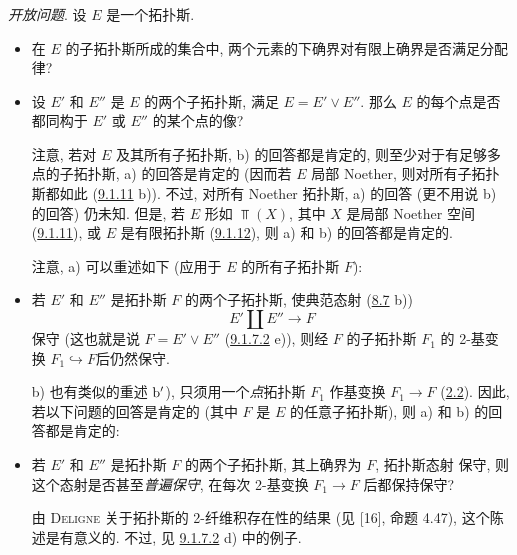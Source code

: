 \setcounter{subsubsection}{13}
\subsubsection{}
\emph{开放问题}.
设 $E$ 是一个拓扑斯.

\begin{itemize}
\item[a)] 在 $E$ 的子拓扑斯所成的集合中,
两个元素的下确界对有限上确界是否满足分配律?

\item[b)] 设 $E'$ 和 $E''$ 是 $E$ 的两个子拓扑斯,
满足 $E=E'\vee E''$.
那么 $E$ 的每个点是否都同构于 $E'$ 或 $E''$ 的某个点的像?

注意, 若对 $E$ 及其所有子拓扑斯, b) 的回答都是肯定的,
则至少对于有足够多点的子拓扑斯, a) 的回答是肯定的
(因而若 $E$ 局部 Noether, 则对所有子拓扑斯都如此
(\hyperref[IV.exer9.1.11]{9.1.11} b)).
不过, 对所有 Noether 拓扑斯, a) 的回答
(更不用说 b) 的回答) 仍未知.
但是, 若 $E$ 形如 $\Top(X)$,
其中 $X$ 是局部 Noether 空间 (\hyperref[IV.exer9.1.11]{9.1.11}),
或 $E$ 是有限拓扑斯 (\hyperref[IV.exer9.1.12]{9.1.12}),
则 a) 和 b) 的回答都是肯定的.

注意, a) 可以重述如下 (应用于 $E$ 的所有子拓扑斯 $F$):

\item[$\rm a'$)] 若 $E'$ 和 $E''$ 是拓扑斯 $F$ 的两个子拓扑斯,
使典范态射 (\cf \hyperref[IV.exer8.7]{8.7} b))
\begin{equation*}
E'\amalg E''\longrightarrow F\tag{9.1.14.1}
\end{equation*}
保守 (这也就是说 $F=E'\vee E''$
(\hyperref[IV.exer9.1.7.2]{9.1.7.2} e)),
则经 $F$ 的子拓扑斯 $F_1$ 的 2-基变换 $F_1\hookrightarrow F$\pageoriginale 后仍然保守.

b) 也有类似的重述 $\rm b'$),
只须用一个\emph{点}拓扑斯 $F_1$ 作基变换 $F_1\rightarrow F$
(\hyperref[IV.subsec2.2]{2.2}).
因此, 若以下问题的回答是肯定的
(其中 $F$ 是 $E$ 的任意子拓扑斯),
则 a) 和 b) 的回答都是肯定的:

\item[c)] 若 $E'$ 和 $E''$ 是拓扑斯 $F$ 的两个子拓扑斯,
其上确界为 $F$,
\ie 拓扑斯态射  保守,
则这个态射是否甚至\emph{普遍保守},
\ie 在每次 2-基变换 $F_1\rightarrow F$ 后都保持保守?

由 \textsc{Deligne} 关于拓扑斯的 2-纤维积存在性的结果
(见 [16], 命题 4.47), 这个陈述是有意义的.
不过, 见 \hyperref[IV.exer9.1.7.2]{9.1.7.2} d) 中的例子.


\end{itemize}
